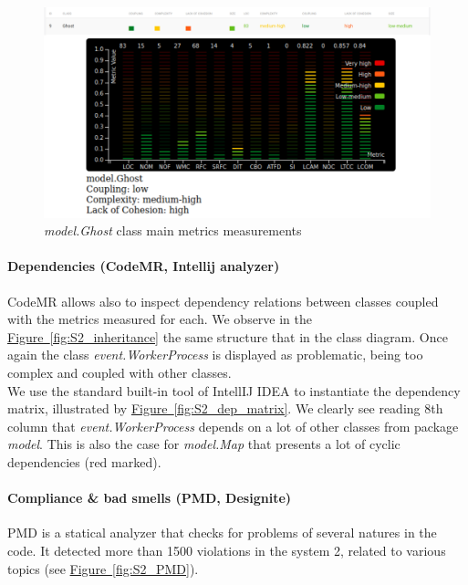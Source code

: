 \documentclass[]{article}
\newcommand{\wordlink}[2]{\hyperref[#2]{#1~\ref{#2}}}
\begin{document}
\begin{figure}[h]
\centering
\includegraphics[width=0.82\linewidth]{S2-Ghost_full}
\caption{\textit{model.Ghost} class main metrics measurements}
\label{fig:S2_ghost}
\end{figure}
  
\newpage

\paragraph{Dependencies (CodeMR, Intellij analyzer)}

CodeMR allows also to inspect dependency relations between classes coupled with the metrics measured for each. We observe in the \wordlink{Figure}{fig:S2_inheritance} the same structure that in the class diagram. Once again the class \textit{event.WorkerProcess} is displayed as problematic, being too complex and coupled with other classes.\\

We use the standard built-in tool of IntellIJ IDEA to instantiate the dependency matrix, illustrated by \wordlink{Figure}{fig:S2_dep_matrix}. We clearly see reading 8th column that \textit{event.WorkerProcess} depends on a lot of other classes from package \textit{model}. This is also the case for \textit{model.Map} that presents a lot of cyclic dependencies (red marked).

\paragraph{Compliance \& bad smells (PMD, Designite)}

PMD is a statical analyzer that checks for problems of several natures in the code. It detected more than 1500 violations in the system 2, related to various topics (see \wordlink{Figure}{fig:S2_PMD}).

\vspace{0.3cm}
\end{document}
